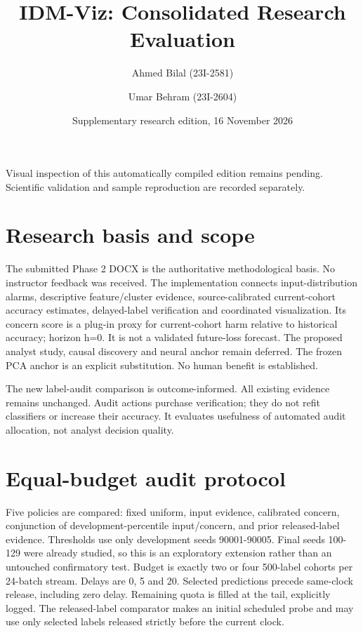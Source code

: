 \documentclass[11pt,a4paper]{article}
\title{IDM-Viz: Consolidated Research Evaluation}
\author{Ahmed Bilal (23I-2581) \and Umar Behram (23I-2604)}
\date{Supplementary research edition, 16 November 2026}
\begin{document}
\maketitle
\noindent Visual inspection of this automatically compiled edition remains pending. Scientific validation and sample reproduction are recorded separately.\par

\section{Research basis and scope}

The submitted Phase 2 DOCX is the authoritative methodological basis. No instructor feedback was received. The implementation connects input-distribution alarms, descriptive feature/cluster evidence, source-calibrated current-cohort accuracy estimates, delayed-label verification and coordinated visualization. Its concern score is a plug-in proxy for current-cohort harm relative to historical accuracy; horizon h=0. It is not a validated future-loss forecast. The proposed analyst study, causal discovery and neural anchor remain deferred. The frozen PCA anchor is an explicit substitution. No human benefit is established.\par

The new label-audit comparison is outcome-informed. All existing evidence remains unchanged. Audit actions purchase verification; they do not refit classifiers or increase their accuracy. It evaluates usefulness of automated audit allocation, not analyst decision quality.\par

\section{Equal-budget audit protocol}

Five policies are compared: fixed uniform, input evidence, calibrated concern, conjunction of development-percentile input/concern, and prior released-label evidence. Thresholds use only development seeds 90001-90005. Final seeds 100-129 were already studied, so this is an exploratory extension rather than an untouched confirmatory test. Budget is exactly two or four 500-label cohorts per 24-batch stream. Delays are 0, 5 and 20. Selected predictions precede same-clock release, including zero delay. Remaining quota is filled at the tail, explicitly logged. The released-label comparator makes an initial scheduled probe and may use only selected labels released strictly before the current clock.\par
\end{document}
